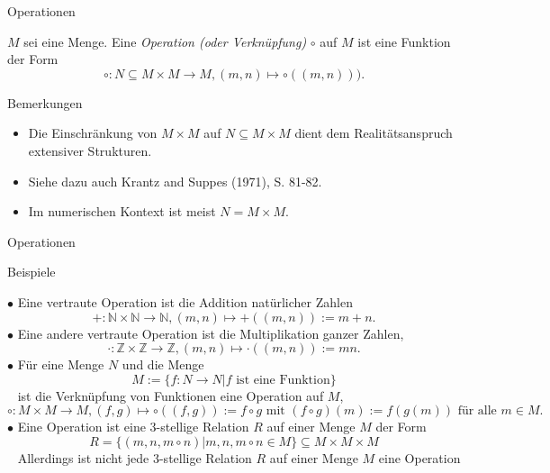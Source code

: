 \documentclass[
  8pt,
  ignorenonframetext,
]{beamer}
\providecommand{\tightlist}{%
  \setlength{\itemsep}{0pt}\setlength{\parskip}{0pt}}
\begin{document}
\begin{frame}{Operationen}
\protect\hypertarget{operationen-1}{}
\small
\begin{definition}[Operation]
$M$ sei eine Menge. Eine \textit{Operation (oder Verknüpfung)} $\circ$ auf $M$ ist eine
Funktion der Form
\begin{equation}
\circ : N \subseteq M \times M \to M, (m,n) \mapsto \circ((m,n))).
\end{equation}
\end{definition}
\footnotesize

Bemerkungen

\begin{itemize}
\tightlist
\item
  Die Einschränkung von \(M \times M\) auf \(N \subseteq M \times M\)
  dient dem Realitätsanspruch extensiver Strukturen.
\item
  Siehe dazu auch Krantz and Suppes (1971), S. 81-82.
\item
  Im numerischen Kontext ist meist \(N = M \times M\).
\end{itemize}
\end{frame}

\begin{frame}{Operationen}
\protect\hypertarget{operationen-2}{}
\small

Beispiele

\footnotesize

\(\bullet\) Eine vertraute Operation ist die Addition natürlicher Zahlen
\begin{equation}
+ : \mathbb{N} \times \mathbb{N} \to \mathbb{N}, (m,n) \mapsto +((m,n)) := m + n.
\end{equation} \(\bullet\) Eine andere vertraute Operation ist die
Multiplikation ganzer Zahlen, \begin{equation}
\cdot : \mathbb{Z} \times \mathbb{Z} \to \mathbb{Z}, (m,n) \mapsto \cdot((m,n)) := mn.
\end{equation} \(\bullet\) Für eine Menge \(N\) und die Menge
\begin{equation}
M := \{f : N \to N| f \mbox{ ist eine Funktion}\}
\end{equation} \(\,\,\,\) ist die Verknüpfung von Funktionen eine
Operation auf \(M\), \begin{equation}
\circ : M \times M \to M, (f,g) \mapsto \circ((f,g)) := f \circ g \mbox{ mit } (f \circ g)(m) := f(g(m)) \mbox{ für alle } m \in M.
\end{equation} \(\bullet\) Eine Operation ist eine 3-stellige Relation
\(R\) auf einer Menge \(M\) der Form \begin{equation}
R = \{(m,n, m\circ n)|m,n,m\circ n \in M\} \subseteq M \times M \times M
\end{equation} \(\,\,\,\) Allerdings ist nicht jede 3-stellige Relation
\(R\) auf einer Menge \(M\) eine Operation
\end{frame}
\end{document}
